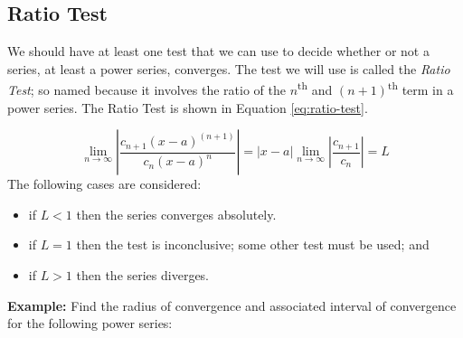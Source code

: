 \subsection{Ratio Test}
We should have at least one test that we can use to decide whether or not a series, at least a power series, converges.  The test we will use is called the \emph{Ratio Test}; so named because it involves the ratio of the $n$\textsuperscript{th} and $(n+1)$\textsuperscript{th} term in a power series.  The Ratio Test is shown in Equation \ref{eq:ratio-test}.

\begin{equation}
\lim_{n \to \infty}\left|\frac{c_{n+1}(x-a)^{(n+1)}}{c_n(x-a)^n} \right| = \left|x-a \right| \lim_{n \to \infty} \left|\frac{c_{n+1}}{c_n} \right| = L
\label{eq:ratio-test}
\end{equation}
The following cases are considered:
\begin{itemize}
\item if $L<1$ then the series converges absolutely.
\item if $L = 1$ then the test is inconclusive; some other test must be used; and
\item if $L > 1$ then the series diverges.
\end{itemize}

\vspace{0.5cm}

\noindent\textbf{Example: } Find the radius of convergence and associated interval of convergence for the following power series:

